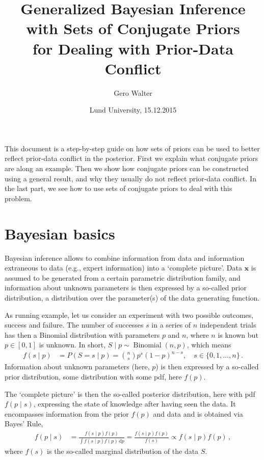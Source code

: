 \documentclass[12pt,a4paper	,twoside]{article}
\title{Generalized Bayesian Inference\\ with Sets of Conjugate Priors\\ for Dealing with Prior-Data Conflict}
\author{Gero Walter}
\date{Lund University, 15.12.2015}
\newcommand{\dd}{\,\mathrm{d}}
\newcommand{\bs}[1]{\boldsymbol{#1}}
\renewcommand{\vec}[1]{{\bs#1}}
\newcommand{\bin}{\operatorname{Binomial}}
\begin{document}
\maketitle

This document is a step-by-step guide on how sets of priors can be used
to better reflect prior-data conflict in the posterior.
First we explain what conjugate priors are along an example.
Then we show how conjugate priors can be constructed using a general result,
and why they usually do not reflect prior-data conflict.
In the last part, we see how to use sets of conjugate priors
to deal with this problem.

\section{Bayesian basics}

Bayesian inference allows to combine information from data
and information extraneous to data (e.g., expert information)
into a `complete picture'.
Data $\vec{x}$ is assumed to be generated from a certain parametric distribution family,
and information about unknown parameters is then expressed by a so-called prior distribution,
a distribution over the parameter(s) of the data generating function.

As running example, let us consider an experiment with two possible outcomes,
success and failure. The number of successes $s$ in a series of $n$ independent trials
has then a Binomial distribution with parameters $p$ and $n$,
where $n$ is known but $p \in [0,1]$ is unknown.
In short, $S\mid p \sim \bin(n,p)$, which means
\begin{align}
f(s\mid p) &= P(S = s \mid p) = {n \choose s} p^s (1-p)^{n-s},\quad s \in \{0, 1, \ldots, n\}\,.
\label{eq:binompmf}
\end{align}
Information about unknown parameters (here, $p$) is then expressed
by a so-called prior distribution, some distribution with some pdf, here $f(p)$.

The `complete picture' is then the so-called posterior distribution,
here with pdf $f(p\mid s)$, expressing the state of knowledge after having seen the data.
It encompasses information from the prior $f(p)$ and data
and is obtained via Bayes' Rule,
\begin{align}
f(p \mid s) &= \frac{f(s\mid p) f(p)}{\int f(s\mid p) f(p) \dd p}
             = \frac{f(s\mid p) f(p)}{f(s)} \propto f(s\mid p) f(p)\,,
\label{eq:bayesrule}
\end{align}
where $f(s)$ is the so-called marginal distribution of the data $S$.
\end{document}
